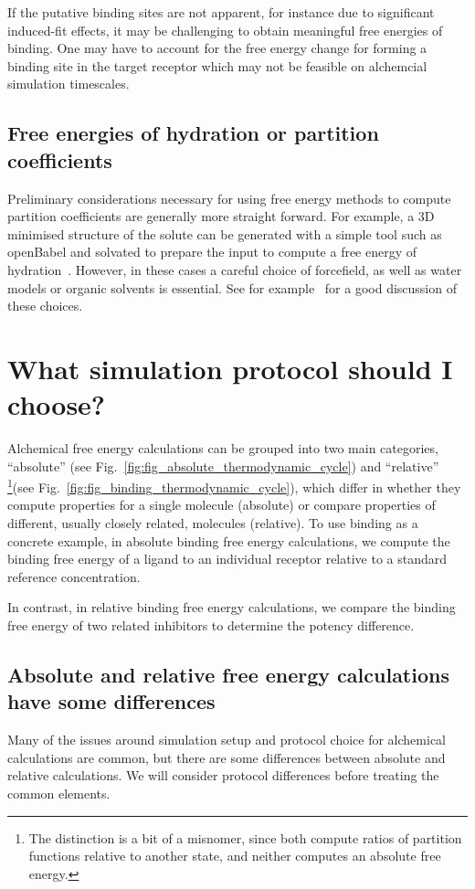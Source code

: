 \documentclass[9pt,bestpractices]{livecoms}
\begin{document}
If the putative binding sites are not apparent, for instance due to significant induced-fit effects, it may be challenging to obtain meaningful free energies of binding. One may have to account for the free energy change for forming a binding site in the target receptor which may not be feasible on alchemcial simulation timescales.

\subsection{Free energies of hydration or partition coefficients}
\label{subsec:hydration}
Preliminary considerations necessary for using free energy methods to compute partition coefficients are generally more straight forward. For example, a 3D minimised structure of the solute can be generated with a simple tool such as openBabel and solvated to prepare the input  to compute a free energy of hydration~\cite{oboyle2011open}. However, in these cases a careful choice of forcefield, as well as water models or organic solvents is essential. See for example~\cite{bosisio2016blinded,rustenburg2016measuring} for a good discussion of these choices. 

\section{What simulation protocol should I choose?}
\label{sec:simulation_protocol_choice}
Alchemical free energy calculations can be grouped into two main categories, ``absolute'' (see Fig.~\ref{fig:fig_absolute_thermodynamic_cycle}) and ``relative'' \footnote{The distinction is a bit of a misnomer, since both compute ratios of partition functions relative to another state, and neither computes an absolute free energy.}(see Fig.~\ref{fig:fig_binding_thermodynamic_cycle}), which differ in whether they compute properties for a single molecule (absolute) or compare properties of different, usually closely related, molecules (relative).
To use binding as a concrete example, in absolute binding free energy calculations, we compute the binding free energy of a ligand to an individual receptor relative to a standard reference concentration.

In contrast, in relative binding free energy calculations, we compare the binding free energy of two related inhibitors to determine the potency difference.
%
\subsection{Absolute and relative free energy calculations have some differences}
Many of the issues around simulation setup and protocol choice for alchemical calculations are common, but there are some differences between absolute and relative calculations. We will consider protocol differences before treating the common elements.
%
\end{document}

